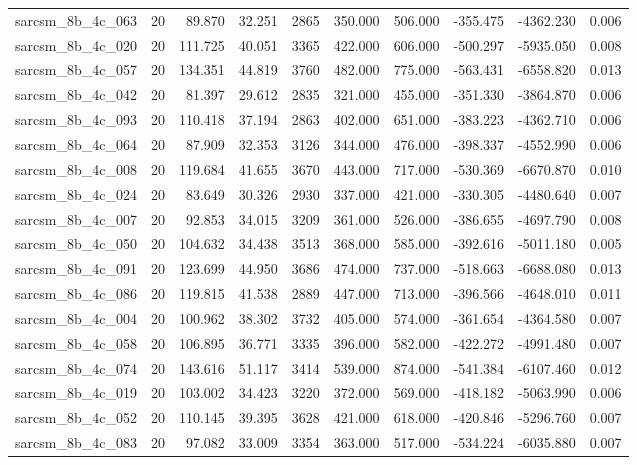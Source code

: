 \begin{tabular}{lrrrrrrrrr}
sarcsm\_8b\_4c\_063 & 20 & 89.870 & 32.251 & 2865 & 350.000 & 506.000 & -355.475 & -4362.230 & 0.006 \\
sarcsm\_8b\_4c\_020 & 20 & 111.725 & 40.051 & 3365 & 422.000 & 606.000 & -500.297 & -5935.050 & 0.008 \\
sarcsm\_8b\_4c\_057 & 20 & 134.351 & 44.819 & 3760 & 482.000 & 775.000 & -563.431 & -6558.820 & 0.013 \\
sarcsm\_8b\_4c\_042 & 20 & 81.397 & 29.612 & 2835 & 321.000 & 455.000 & -351.330 & -3864.870 & 0.006 \\
sarcsm\_8b\_4c\_093 & 20 & 110.418 & 37.194 & 2863 & 402.000 & 651.000 & -383.223 & -4362.710 & 0.006 \\
sarcsm\_8b\_4c\_064 & 20 & 87.909 & 32.353 & 3126 & 344.000 & 476.000 & -398.337 & -4552.990 & 0.006 \\
sarcsm\_8b\_4c\_008 & 20 & 119.684 & 41.655 & 3670 & 443.000 & 717.000 & -530.369 & -6670.870 & 0.010 \\
sarcsm\_8b\_4c\_024 & 20 & 83.649 & 30.326 & 2930 & 337.000 & 421.000 & -330.305 & -4480.640 & 0.007 \\
sarcsm\_8b\_4c\_007 & 20 & 92.853 & 34.015 & 3209 & 361.000 & 526.000 & -386.655 & -4697.790 & 0.008 \\
sarcsm\_8b\_4c\_050 & 20 & 104.632 & 34.438 & 3513 & 368.000 & 585.000 & -392.616 & -5011.180 & 0.005 \\
sarcsm\_8b\_4c\_091 & 20 & 123.699 & 44.950 & 3686 & 474.000 & 737.000 & -518.663 & -6688.080 & 0.013 \\
sarcsm\_8b\_4c\_086 & 20 & 119.815 & 41.538 & 2889 & 447.000 & 713.000 & -396.566 & -4648.010 & 0.011 \\
sarcsm\_8b\_4c\_004 & 20 & 100.962 & 38.302 & 3732 & 405.000 & 574.000 & -361.654 & -4364.580 & 0.007 \\
sarcsm\_8b\_4c\_058 & 20 & 106.895 & 36.771 & 3335 & 396.000 & 582.000 & -422.272 & -4991.480 & 0.007 \\
sarcsm\_8b\_4c\_074 & 20 & 143.616 & 51.117 & 3414 & 539.000 & 874.000 & -541.384 & -6107.460 & 0.012 \\
sarcsm\_8b\_4c\_019 & 20 & 103.002 & 34.423 & 3220 & 372.000 & 569.000 & -418.182 & -5063.990 & 0.006 \\
sarcsm\_8b\_4c\_052 & 20 & 110.145 & 39.395 & 3628 & 421.000 & 618.000 & -420.846 & -5296.760 & 0.007 \\
sarcsm\_8b\_4c\_083 & 20 & 97.082 & 33.009 & 3354 & 363.000 & 517.000 & -534.224 & -6035.880 & 0.007 \\

\end{tabular}
